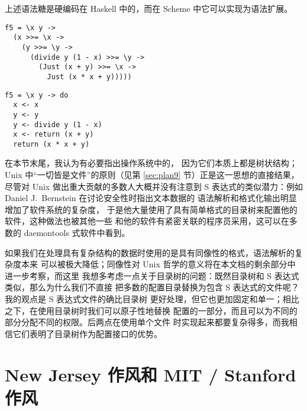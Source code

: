 上述语法糖是硬编码在 Haskell 中的，而在 Scheme 中它可以实现为语法扩展。
\pagebreak
\colskipa\begin{multicols}{2}
\begin{quoting}
\begin{Verbatim}
f5 = \x y ->
  (x >>= \x ->
    (y >>= \y ->
      (divide y (1 - x) >>= \y ->
        (Just (x + y) >>= \x ->
          Just (x * x + y)))))
\end{Verbatim}
\end{quoting}
\begin{quoting}
\begin{Verbatim}
f5 = \x y -> do
  x <- x
  y <- y
  y <- divide y (1 - x)
  x <- return (x + y)
  return (x * x + y)
\end{Verbatim}
\end{quoting}
\end{multicols}\colskipb

在本节末尾，我认为有必要指出操作系统中的，
因为它们本质上都是树状结构；Unix 中“一切皆是文件”的原则（见第 \ref{sec:plan9}
节）正是这一思想的直接结果，尽管对 Unix 做出重大贡献的多数人大概并没有注意到
S 表达式的类似潜力：例如 Daniel J.\ Bernstein 在讨论安全性时指出文本数据的
语法解析和格式化输出明显增加了软件系统的复杂度，
于是他大量使用了具有简单格式的目录树来配置他的软件，这种做法也被其他一些
和他的软件有紧密关联的程序员采用，这可以在多数的 daemontools 式软件中看到。

如果我们在处理具有复杂结构的数据时使用的是具有同像性的格式，语法解析的复杂度本来
可以被极大降低；同像性对 Unix 哲学的意义将在本文档的剩余部分中进一步考察，而这里
我想多考虑一点关于目录树的问题：既然目录树和 S 表达式类似，那么为什么我们不直接
把多数的配置目录替换为包含 S 表达式的文件呢？我的观点是 S 表达式文件的确比目录树
更好处理，但它也更加固定和单一；相比之下，在使用目录树时我们可以原子性地替换
配置的一部分，而且可以为不同的部分分配不同的权限。后两点在使用单个文件
时实现起来都要复杂得多，而我相信它们表明了目录树作为配置接口的优势。

\section{New Jersey 作风和 MIT / Stanford 作风}\label{sec:wib}

